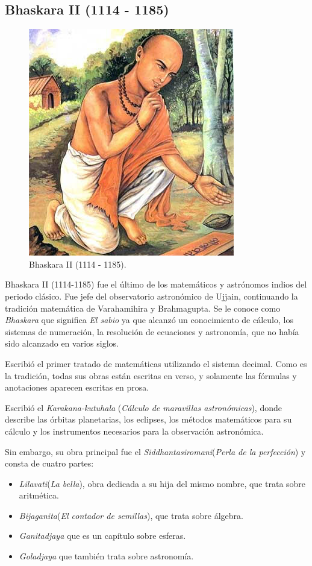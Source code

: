 \documentclass[a4paper, 11pt]{article}
\begin{document}
	\subsection{Bhaskara II (1114 - 1185)}
		\begin{figure}[!ht]
			\centering
			\includegraphics[width = 7 cm]{bhaskara_II.jpg}
			\caption{Bhaskara II (1114 - 1185).}
			\label{fig:bhaskara_II}
		\end{figure}

		Bhaskara II (1114-1185) fue el último de los matemáticos y astrónomos indios del periodo clásico. Fue jefe del
		observatorio astronómico de Ujjain, continuando la tradición matemática de Varahamihira y Brahmagupta. Se le
		conoce como \textit{Bhaskara} que significa \textit{El sabio} ya que alcanzó un conocimiento de cálculo, los
		sistemas de numeración, la resolución de ecuaciones y astronomía, que no había sido alcanzado en varios siglos.
		
		Escribió el primer tratado de matemáticas utilizando el sistema decimal. Como es la tradición, todas sus obras
		están escritas en verso, y solamente las fórmulas y anotaciones aparecen escritas en prosa.
		
		Escribió el \textit{Karakana-kutuhala} (\textit{Cálculo de maravillas astronómicas}), donde describe las órbitas
		planetarias, los eclipses, los métodos matemáticos para su cálculo y los instrumentos necesarios para la
		observación astronómica.
		
		Sin embargo, su obra principal fue el \textit{Siddhantasiromani}(\textit{Perla de la perfección}) y consta de
		cuatro partes:
		\begin{itemize}
			\item \textit{Lilavati}(\textit{La bella}), obra dedicada a su hija del mismo nombre, que trata sobre aritmética.
			\item \textit{Bijaganita}(\textit{El contador de semillas}), que trata sobre álgebra.
			\item \textit{Ganitadjaya} que es un capítulo sobre esferas.
			\item \textit{Goladjaya} que también trata sobre astronomía.
		\end{itemize}
		
\end{document}
